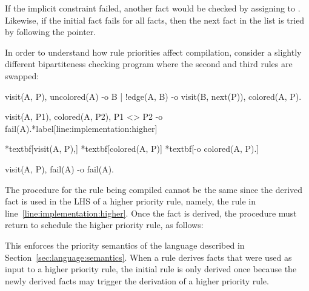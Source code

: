 If the implicit constraint failed, another  fact would be checked
by assigning  to .  Likewise, if the initial
 fact fails for all  facts, then the next
 fact in the list is tried by following the  pointer.

In order to understand how rule priorities affect compilation, consider a
slightly different bipartiteness checking program where the second and third
rules are swapped:

\begin{LineCode}[commandchars=\*\[\]]
visit(A, P),
uncolored(A)
   -o {B | !edge(A, B) -o visit(B, next(P))},
      colored(A, P).

visit(A, P1),
colored(A, P2),
P1 <> P2
   -o fail(A).*label[line:implementation:higher]

*textbf[visit(A, P),]
*textbf[colored(A, P)]
   *textbf[-o colored(A, P).]

visit(A, P),
fail(A)
   -o fail(A).
\end{LineCode}

The procedure for the rule being compiled cannot be the same since the derived
 fact is used in the LHS of a higher priority rule, namely, the
rule in line~\ref{line:implementation:higher}. Once the  fact is
derived, the procedure must return to schedule the higher priority rule, as
follows:


This enforces the priority semantics of the language described in
Section~\ref{sec:language:semantics}. When a rule derives facts
that were used as input to a higher priority rule, the initial rule is only
derived once because the newly derived facts may trigger the derivation of a
higher priority rule.
    
